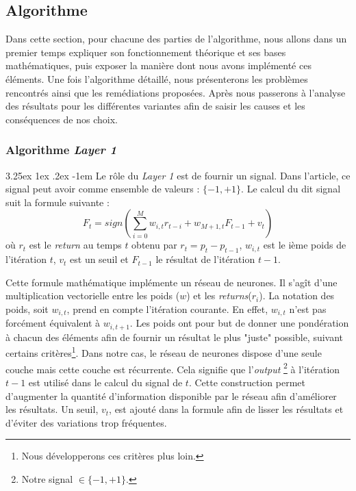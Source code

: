 \documentclass[a4paper, 11pt]{article}
\makeatletter
\renewcommand\paragraph{\@startsection{paragraph}{5}{\z@}%
  {3.25ex \@plus1ex \@minus.2ex}%
  {-1em}%
  {\normalfont\normalsize\bfseries}}
\makeatother
\begin{document}
\subsection{Algorithme}
Dans cette section, pour chacune des parties de l'algorithme, nous allons dans un premier temps expliquer son fonctionnement théorique et ses bases
mathématiques, puis exposer la manière dont nous avons implémenté ces éléments.
Une fois l'algorithme détaillé, nous présenterons les problèmes rencontrés ainsi que les remédiations proposées. Après nous passerons à l'analyse des
résultats pour les différentes variantes afin de saisir les causes et les conséquences de nos choix.


\subsubsection{Algorithme \textit{Layer 1}}
\paragraph{}
Le rôle du \textit{Layer 1} est de fournir un signal. Dans l'article, ce signal peut avoir comme ensemble de valeurs : $\{-1,+1\}$. Le calcul du dit
signal suit la formule suivante \cite{fx_trading}:
$$F_t = sign(\sum_{i=0}^M w_{i,t} r_{t-i} + w_{M+1,t} F_{t-1} + v_t)$$
où $r_t$ est le \textit{return} au temps $t$ obtenu par $r_t = p_t - p_{t-1}$, $w_{i,t}$ est le ième poids de l'itération $t$, $v_t$ est un seuil et $F_{t-1}$ le résultat de l'itération $t-1$.

Cette formule mathématique implémente un réseau de neurones. Il s'agît d'une multiplication vectorielle entre les poids ($w$) et les \textit{returns}($r_i$). La notation des poids, soit $w_{i,t}$, prend en compte l'itération courante. En effet, $w_{i,t}$ n'est pas forcément équivalent à $w_{i,t+1}$. Les poids ont pour but de donner une pondération à chacun des éléments afin de fournir un résultat le plus "juste" possible, suivant certains
critères\footnote{Nous développerons ces critères plus loin.}.
Dans notre cas, le réseau de neurones dispose d'une seule couche mais cette couche est récurrente. Cela signifie que l'\textit{output}
\footnote{Notre signal $\in \{-1,+1\}$.} à l'itération $t-1$ est utilisé dans le calcul du signal de $t$. Cette construction permet d'augmenter
la quantité d'information disponible par le réseau afin d'améliorer les résultats.
Un seuil, $v_t$, est ajouté dans la formule afin de lisser les résultats et d'éviter des variations trop fréquentes.
\end{document}
